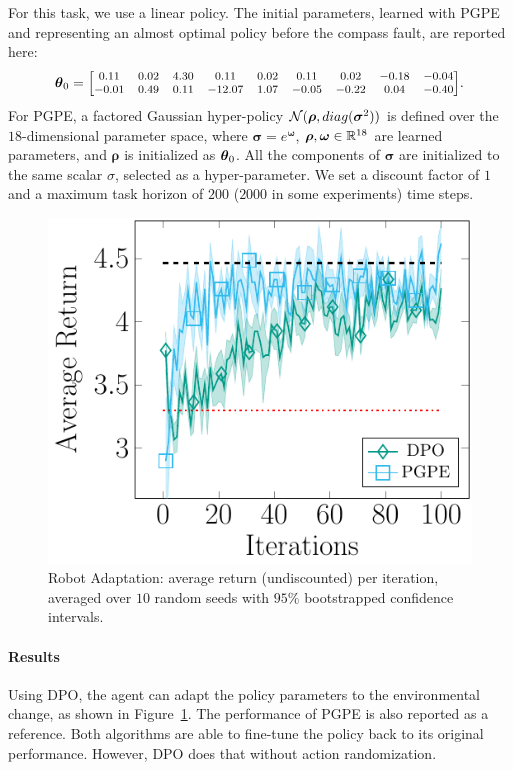 For this task, we use a linear policy. The initial parameters, learned with \ac{PGPE} and representing an almost optimal policy before the compass fault, are reported here:
\[
\vtheta_{0} = 
\medmath{\begin{bmatrix}
0.11& 0.02& 4.30& 0.11& 0.02& 0.11& 0.02& -0.18& -0.04\\
-0.01& 0.49& 0.11& -12.07& 1.07& -0.05& -0.22& 0.04& -0.40\\
\end{bmatrix}}.
\]
For \ac{PGPE}, a factored Gaussian hyper-policy $\mathcal{N}(\boldsymbol{\rho},\mathop{diag}(\boldsymbol{\sigma}^2))$ is defined over the $18$-dimensional parameter space, where $\boldsymbol{\sigma}=e^{\boldsymbol{\omega}}$, $\boldsymbol{\rho},\boldsymbol{\omega}\in\mathbb{R}^{18}$ are learned parameters, and $\boldsymbol{\rho}$ is initialized as $\boldsymbol{\theta}_{0}$. All the components of $\boldsymbol{\sigma}$ are initialized to the same scalar $\sigma$, selected as a hyper-parameter.
We set a discount factor of $1$ and a maximum task horizon of $200$ ($2000$ in some experiments) time steps.
\begin{figure}[t]
	\centering
	\includegraphics[scale=1.1]{plots/recover.pdf}
	\caption{Robot Adaptation: average return (undiscounted) per iteration, averaged over $10$ random seeds with $95\%$ bootstrapped confidence intervals.}
	\label{fig:recover}
\end{figure}

\paragraph{Results}
Using \ac{DPO}, the agent can adapt the policy parameters to the environmental change, as shown in Figure~\ref{fig:recover}. The performance of \ac{PGPE} is also reported as a reference. Both algorithms are able to fine-tune the policy back to its original performance. However, \ac{DPO} does that without action randomization.

